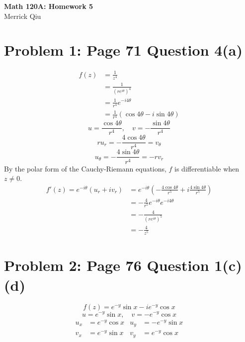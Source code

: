 \documentclass{article}
\begin{document}
\begin{center}
	\huge{\bf Math 120A: Homework 5} \\
	Merrick Qiu
\end{center}
\section*{Problem 1: Page 71 Question 4(a)}
\begin{align*}
	f(z) &= \frac{1}{z^4} \\
	&= \frac{1}{(re^{i\theta})^4} \\
	&= \frac{1}{r^4}e^{-i4\theta} \\
	&= \frac{1}{r^4}(\cos 4\theta - i\sin 4\theta)
\end{align*}
\[
	u = \frac{\cos 4\theta}{r^4}, \quad v = -\frac{\sin 4\theta}{r^4}
\]
\[
	ru_r = -\frac{4\cos 4\theta}{r^4} = v_\theta
\]
\[
	u_\theta = -\frac{4\sin 4\theta}{r^4} = -rv_r
\]
By the polar form of the Cauchy-Riemann equations,
$f$ is differentiable when $z \neq 0$.
\begin{align*}
	f'(z) = e^{-i\theta}(u_r + iv_r) &= e^{-i\theta}\left(-\frac{4\cos 4\theta}{r^5} + i \frac{4\sin 4\theta}{r^5}\right) \\
	&= -\frac{4}{r^5}e^{-i\theta}e^{-i4\theta} \\
	&= -\frac{4}{(re^{i\theta})^5} \\
	&= -\frac{4}{z^5}
\end{align*}
\newpage 

\section*{Problem 2: Page 76 Question 1(c)(d)}
\[
	f(z) = e^{-y} \sin x - i e^{-y}\cos x
\]
\[
	u = e^{-y} \sin x, \quad v = -e^{-y}\cos x
\]
\begin{equation*}
	\begin{aligned}
		u_x &= e^{-y}\cos x & u_y &= -e^{-y}\sin x \\
		v_x &= e^{-y}\sin x & v_y &= e^{-y}\cos x 
	\end{aligned}
\end{equation*}
\end{document}
